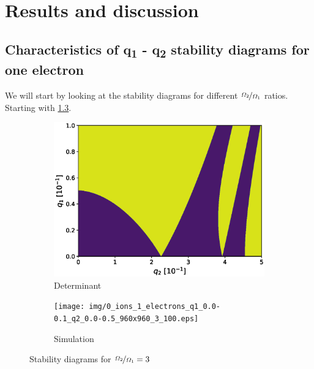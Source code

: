 \chapter{Results and discussion}

\section{Characteristics of q\textsubscript{1} - q\textsubscript{2} stability diagrams for one electron}


We will start by looking at the stability diagrams for different $\nicefrac{\Omega_2}{\Omega_1}$ ratios. Starting with \ref{fig:stabil-eta=3}.

\begin{figure}[H]
\begin{subfigure}{.5\textwidth}
  \centering
  \includegraphics[width=\linewidth]{img/det_q1_0.0-0.1_q2_0.0-0.5_900x900_3.eps}
  \caption{Determinant}
  \label{fig:det_3}
\end{subfigure}%
\begin{subfigure}{.5\textwidth}
  \centering
  \texttt{[image: img/0\_ions\_1\_electrons\_q1\_0.0-0.1\_q2\_0.0-0.5\_960x960\_3\_100.eps]}  
  \caption{Simulation}
  \label{fig:sim_3}
\end{subfigure}
\caption{Stability diagrams for $\nicefrac{\Omega_2}{\Omega_1} = 3$}
\label{fig:stabil-eta=3}
\end{figure}

